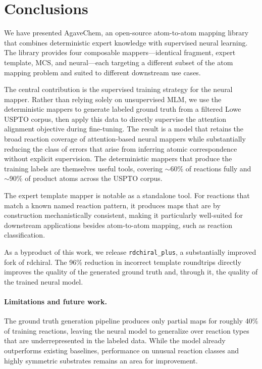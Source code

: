 \documentclass[12pt]{article}
\begin{document}

\section{Conclusions}
\label{sec:conclusions}

We have presented AgaveChem, an open-source atom-to-atom mapping
library that combines deterministic expert knowledge with supervised
neural learning.  The library provides four composable mappers---identical
fragment, expert template, MCS, and neural---each targeting a different
subset of the atom mapping problem and suited to different downstream
use cases.

The central contribution is the supervised training strategy for the
neural mapper.  Rather than relying solely on unsupervised MLM, we use the
deterministic mappers to generate labeled ground truth from a filtered
Lowe USPTO corpus, then apply this data to directly supervise the
attention alignment objective during fine-tuning.  The result is a
model that retains the broad reaction coverage of attention-based
neural mappers while substantially reducing the class of errors that
arise from inferring atomic correspondence without explicit supervision.  
The deterministic mappers that produce the
training labels are themselves useful tools, covering $\sim$60\% of
reactions fully and $\sim$90\% of product atoms across the USPTO corpus.

The expert template mapper is notable as a standalone tool.  For
reactions that match a known named reaction pattern, it produces maps
that are by construction mechanistically consistent, making it
particularly well-suited for downstream applications besides atom-to-atom mapping,
 such as reaction classification.

As a byproduct of this work, we release \texttt{rdchiral\_plus}, a
substantially improved fork of rdchiral.  The 96\% reduction in
incorrect template roundtrips directly improves the quality of the
generated ground truth and, through it, the quality of the trained
neural model.

\paragraph{Limitations and future work.}
The ground truth generation pipeline produces only partial maps for
roughly 40\% of training reactions, leaving the neural model to
generalize over reaction types that are underrepresented in the labeled
data.  While the model already outperforms existing baselines,
performance on unusual reaction classes and highly symmetric substrates
remains an area for improvement.
\end{document}

